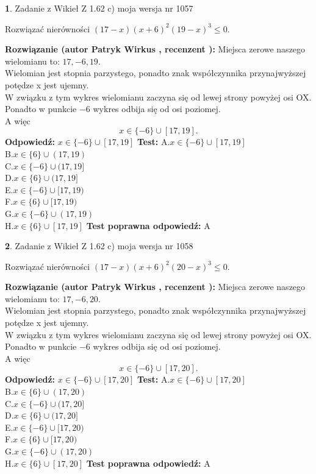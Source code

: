 \documentclass[12pt, a4paper]{article}
\theoremstyle{definition} %
\newtheorem{zad}{}
\newcommand{\zadStart}[1]{\begin{zad}#1\newline}
\newcommand{\zadStop}{\end{zad}}
\newcommand{\rozwStart}[2]{\noindent \textbf{Rozwiązanie (autor #1 , recenzent #2): }\newline}
\newcommand{\rozwStop}{\newline}
\newcommand{\odpStart}{\noindent \textbf{Odpowiedź:}\newline}
\newcommand{\odpStop}{\newline}
\newcommand{\testStart}{\noindent \textbf{Test:}\newline}
\newcommand{\testStop}{\newline}
\newcommand{\kluczStart}{\noindent \textbf{Test poprawna odpowiedź:}\newline}
\newcommand{\kluczStop}{\newline}
\begin{document}
\zadStart{Zadanie z Wikieł Z 1.62 c) moja wersja nr 1057}

Rozwiązać nierówności $(17-x)(x+6)^{2}(19-x)^{3}\le0$.
\zadStop
\rozwStart{Patryk Wirkus}{}
Miejsca zerowe naszego wielomianu to: $17, -6, 19$.\\
Wielomian jest stopnia parzystego, ponadto znak współczynnika przy\linebreak najwyższej potędze x jest ujemny.\\ W związku z tym wykres wielomianu zaczyna się od lewej strony powyżej osi OX.\\
Ponadto w punkcie $-6$ wykres odbija się od osi poziomej.\\
A więc $$x \in \{-6\} \cup [17,19].$$
\rozwStop
\odpStart
$x \in \{-6\} \cup [17,19]$
\odpStop
\testStart
A.$x \in \{-6\} \cup [17,19]$\\
B.$x \in \{6\} \cup (17,19)$\\
C.$x \in \{-6\} \cup (17,19]$\\
D.$x \in \{6\} \cup (17,19]$\\
E.$x \in \{-6\} \cup [17,19)$\\
F.$x \in \{6\} \cup [17,19)$\\
G.$x \in \{-6\} \cup (17,19)$\\
H.$x \in \{6\} \cup [17,19]$
\testStop
\kluczStart
A
\kluczStop



\zadStart{Zadanie z Wikieł Z 1.62 c) moja wersja nr 1058}

Rozwiązać nierówności $(17-x)(x+6)^{2}(20-x)^{3}\le0$.
\zadStop
\rozwStart{Patryk Wirkus}{}
Miejsca zerowe naszego wielomianu to: $17, -6, 20$.\\
Wielomian jest stopnia parzystego, ponadto znak współczynnika przy\linebreak najwyższej potędze x jest ujemny.\\ W związku z tym wykres wielomianu zaczyna się od lewej strony powyżej osi OX.\\
Ponadto w punkcie $-6$ wykres odbija się od osi poziomej.\\
A więc $$x \in \{-6\} \cup [17,20].$$
\rozwStop
\odpStart
$x \in \{-6\} \cup [17,20]$
\odpStop
\testStart
A.$x \in \{-6\} \cup [17,20]$\\
B.$x \in \{6\} \cup (17,20)$\\
C.$x \in \{-6\} \cup (17,20]$\\
D.$x \in \{6\} \cup (17,20]$\\
E.$x \in \{-6\} \cup [17,20)$\\
F.$x \in \{6\} \cup [17,20)$\\
G.$x \in \{-6\} \cup (17,20)$\\
H.$x \in \{6\} \cup [17,20]$
\testStop
\kluczStart
A
\kluczStop
\end{document}
